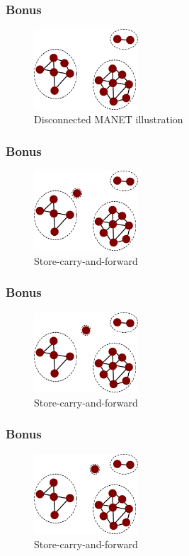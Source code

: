   \begin{frame}
    \frametitle{Bonus}
    \begin{figure}[p]
      \centering
      \includegraphics[height=3cm]{./imgs/dmanet.pdf}
      \caption{Disconnected MANET illustration}
      \label{fig:dmanet}
    \end{figure}
  \end{frame}
  \begin{frame}
    \frametitle{Bonus}
    \begin{figure}[p]
      \centering
      \includegraphics[height=3cm]{./imgs/store-carry-fwd-0.pdf}
      \caption{Store-carry-and-forward}
    \end{figure}
  \end{frame}
  \begin{frame}
    \frametitle{Bonus}
    \begin{figure}[p]
      \centering
      \includegraphics[height=3cm]{./imgs/store-carry-fwd-1.pdf}
      \caption{Store-carry-and-forward}
    \end{figure}
  \end{frame}
  \begin{frame}
    \frametitle{Bonus}
    \begin{figure}[p]
      \centering
      \includegraphics[height=3cm]{./imgs/store-carry-fwd-2.pdf}
      \caption{Store-carry-and-forward}
    \end{figure}
  \end{frame}
